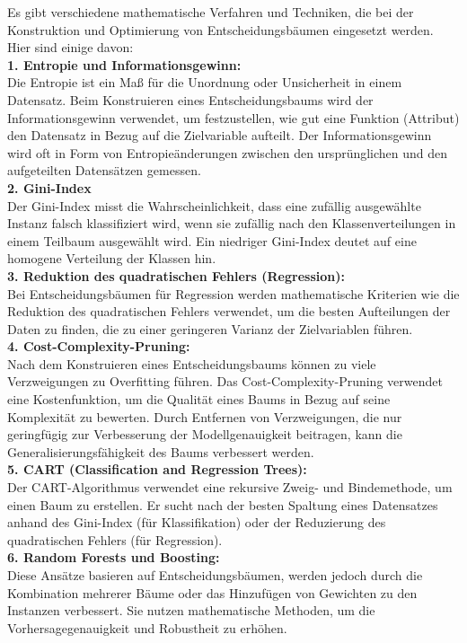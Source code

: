 \documentclass[12pt]{article}
\begin{document}
Es gibt verschiedene mathematische Verfahren und Techniken, die bei der Konstruktion und Optimierung von Entscheidungsbäumen eingesetzt werden. Hier sind einige davon:\\[0.2cm]
%
\textbf{1. Entropie und Informationsgewinn:}\\
Die Entropie ist ein Maß für die Unordnung oder Unsicherheit in einem Datensatz. Beim Konstruieren eines Entscheidungsbaums wird der Informationsgewinn verwendet, um festzustellen, wie gut eine Funktion (Attribut) den Datensatz in Bezug auf die Zielvariable aufteilt. Der Informationsgewinn wird oft in Form von Entropieänderungen zwischen den ursprünglichen und den aufgeteilten Datensätzen gemessen.\\[0.2cm]
%
\textbf{2. Gini-Index}\\
Der Gini-Index misst die Wahrscheinlichkeit, dass eine zufällig ausgewählte Instanz falsch klassifiziert wird, wenn sie zufällig nach den Klassenverteilungen in einem Teilbaum ausgewählt wird. Ein niedriger Gini-Index deutet auf eine homogene Verteilung der Klassen hin.\\[0.2cm]
%
\textbf{3. Reduktion des quadratischen Fehlers (Regression):}\\
Bei Entscheidungsbäumen für Regression werden mathematische Kriterien wie die Reduktion des quadratischen Fehlers verwendet, um die besten Aufteilungen der Daten zu finden, die zu einer geringeren Varianz der Zielvariablen führen.\\[0.2cm]
%
\textbf{4. Cost-Complexity-Pruning:}\\
Nach dem Konstruieren eines Entscheidungsbaums können zu viele Verzweigungen zu Overfitting führen. Das Cost-Complexity-Pruning verwendet eine Kostenfunktion, um die Qualität eines Baums in Bezug auf seine Komplexität zu bewerten. Durch Entfernen von Verzweigungen, die nur geringfügig zur Verbesserung der Modellgenauigkeit beitragen, kann die Generalisierungsfähigkeit des Baums verbessert werden.\\[0.2cm]
%
\textbf{5. CART (Classification and Regression Trees):}\\
Der CART-Algorithmus verwendet eine rekursive Zweig- und Bindemethode, um einen Baum zu erstellen. Er sucht nach der besten Spaltung eines Datensatzes anhand des Gini-Index (für Klassifikation) oder der Reduzierung des quadratischen Fehlers (für Regression).\\[0.2cm]
%
\textbf{6. Random Forests und Boosting:}\\
Diese Ansätze basieren auf Entscheidungsbäumen, werden jedoch durch die Kombination mehrerer Bäume oder das Hinzufügen von Gewichten zu den Instanzen verbessert. Sie nutzen mathematische Methoden, um die Vorhersagegenauigkeit und Robustheit zu erhöhen.\\[0.2cm]
\end{document}
